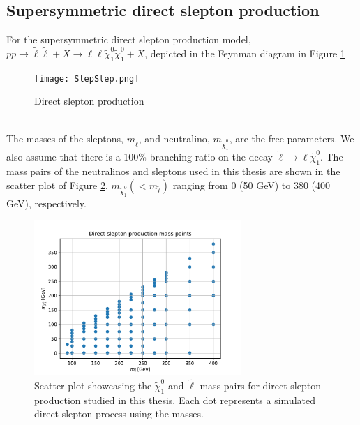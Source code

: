 \documentclass[12pt, a4paper]{book}
\begin{document}
\subsection{Supersymmetric direct slepton production}
For the supersymmetric direct slepton production model, $pp\rightarrow\tilde{\ell}\tilde{\ell}+X\rightarrow \ell\ell\tilde{\chi}_1^0\tilde{\chi}_1^0+X$, depicted in the Feynman diagram in Figure \ref{fig:designer_got_me_slepslep}
\begin{figure}[!h]
    \centering
    \texttt{[image: SlepSlep.png]}
    \caption{Direct slepton production}\label{fig:designer_got_me_slepslep}
\end{figure}
\\The masses of the sleptons, $m_{\tilde{\ell}}$, and neutralino, $m_{\tilde{\chi}_1^0}$, are the free parameters. We also assume that there is a 100\% branching ratio on the decay $\tilde{\ell}\rightarrow \ell\tilde{\chi}_1^0$. 
The mass pairs of the neutralinos and sleptons used in this thesis are shown in the scatter plot of Figure \ref{fig:slepslep_mass}. $m_{\tilde{\chi}_1^0}(<m_{\tilde{\ell}})$ ranging from 0 (50 GeV) to 380 (400 GeV), respectively.
\graphicspath{{../../../Plots/2d_masses/}}
\begin{figure}[!ht]
    \centering
    \includegraphics[width=0.7\textwidth]{SlepSlep.pdf}
    \caption[$\tilde{\chi}_1^0$ and $\tilde{\ell}$ mass pairs for direct slepton production]{Scatter plot showcasing the $\tilde{\chi}_1^0$ and $\tilde{\ell}$ mass pairs for direct slepton production studied in this thesis. Each dot represents a simulated direct slepton process using the masses.}\label{fig:slepslep_mass}
\end{figure}



\graphicspath{{../../figures/}}
\end{document}

